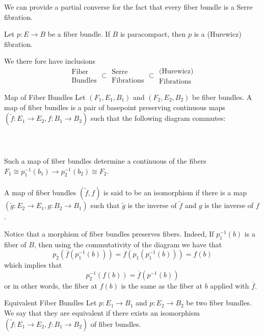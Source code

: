 \documentclass[a4paper]{article}
\begin{document}
We can provide a partial converse for the fact that every fiber bundle is a Serre fibration. 

\begin{prp}{}{} Let $p:E\to B$ be a fiber bundle. If $B$ is paracompact, then $p$ is a (Hurewicz) fibration. 
\end{prp}

We there fore have inclusions $$\substack{\text{Fiber}\\\text{Bundles}}\subset\substack{\text{Serre}\\\text{Fibrations}}\subset\substack{\text{(Hurewicz)}\\\text{Fibrations}}$$

\begin{defn}{Map of Fiber Bundles}{} Let $(F_1,E_1,B_1)$ and $(F_2,E_2,B_2)$ be fiber bundles. A map of fiber bundles is a pair of basepoint preserving continuous maps $(\tilde{f}:E_1\to E_2,f:B_1\to B_2)$ such that the following diagram commutes: \\~\\
\\~\\
Such a map of fiber bundles determine a continuous of the fibers $F_1\cong p_1^{-1}(b_1)\to p_2^{-1}(b_2)\cong F_2$. \\~\\

A map of fiber bundles $(\tilde{f},f)$ is said to be an isomorphism if there is a map $(\tilde{g}:E_2\to E_1,g:B_2\to B_1)$ such that $\tilde{g}$ is the inverse of $\tilde{f}$ and $g$ is the inverse of $f$. 
\end{defn}

Notice that a morphism of fiber bundles preserves fibers. Indeed, If $p_1^{-1}(b)$ is a fiber of $B$, then using the commutativity of the diagram we have that $$p_2(\overline{f}(p_1^{-1}(b)))=f(p_1(p_1^{-1}(b)))=f(b)$$ which implies that $$p_2^{-1}(f(b))=\overline{f}(p^{-1}(b))$$ or in other words, the fiber at $f(b)$ is the same as the fiber at $b$ applied with $\overline{f}$. 

\begin{defn}{Equivalent Fiber Bundles}{} Let $p:E_1\to B_1$ and $p:E_2\to B_2$ be two fiber bundles. We say that they are equivalent if there exists an isomorphism $(\tilde{f}:E_1\to E_2,f:B_1\to B_2)$ of fiber bundles. 
\end{defn}
\end{document}
